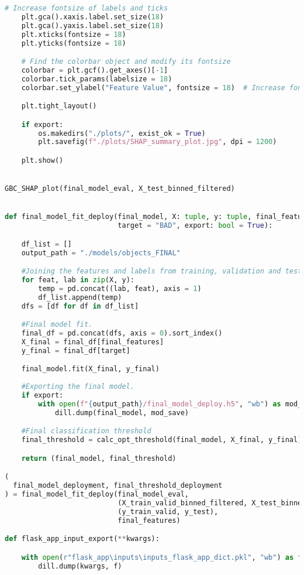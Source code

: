 \begin{lstlisting}[language=Python, basicstyle=\footnotesize\ttfamily]
    # Increase fontsize of labels and ticks
    plt.gca().xaxis.label.set_size(18)
    plt.gca().yaxis.label.set_size(18)
    plt.xticks(fontsize = 18)
    plt.yticks(fontsize = 18)

    # Find the colorbar object and modify its fontsize
    colorbar = plt.gcf().get_axes()[-1]
    colorbar.tick_params(labelsize = 18)
    colorbar.set_ylabel("Feature Value", fontsize = 18)  # Increase fontsize of the "Feature Value" label

    plt.tight_layout()

    if export:
        os.makedirs("./plots/", exist_ok = True)
        plt.savefig(f"./plots/SHAP_summary_plot.jpg", dpi = 1200)

    plt.show()


GBC_SHAP_plot(final_model_eval, X_test_binned_filtered)


def final_model_fit_deploy(final_model, X: tuple, y: tuple, final_features: list,
                           target = "BAD", export: bool = True):

    df_list = []
    output_path = "./models/objects_FINAL"

    #Joining the features and labels from training, validation and test sets.
    for feat, lab in zip(X, y):
        temp = pd.concat((lab, feat), axis = 1)
        df_list.append(temp)
    dfs = [df for df in df_list]

    #Final model fit.
    final_df = pd.concat(dfs, axis = 0).sort_index()
    X_final = final_df[final_features]
    y_final = final_df[target]

    final_model.fit(X_final, y_final)
    
    #Exporting the final model.
    if export:
        with open(f"{output_path}/final_model_deploy.h5", "wb") as mod_save:
            dill.dump(final_model, mod_save)

    #Final classification threshold
    final_threshold = calc_opt_threshold(final_model, X_final, y_final)

    return (final_model, final_threshold)

(
  final_model_deployment, final_threshold_deployment
) = final_model_fit_deploy(final_model_eval,
                           (X_train_valid_binned_filtered, X_test_binned_filtered),
						   (y_train_valid, y_test),
						   final_features)

def flask_app_input_export(**kwargs):

    with open(r"flask_app\inputs\inputs_flask_app_dict.pkl", "wb") as f:
        dill.dump(kwargs, f)


\end{lstlisting}
